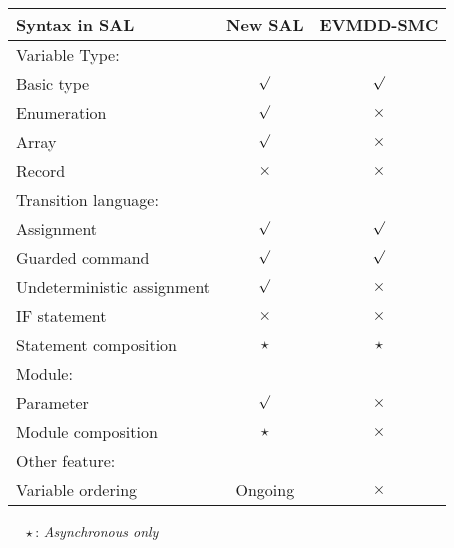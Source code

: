 
\begin{table}
\begin{center}
\small
\begin{tabular}{|l|c|c|}
\hline
 Syntax in SAL & New SAL & EVMDD-SMC \\
\hline
\multicolumn{3}{|l|}{Variable Type:} \\
\hline
Basic type	& $\surd$ 	& $\surd$  \\
Enumeration	& $\surd$	& $\times$ \\			  
Array		& $\surd$	& $\times$ \\			
Record		& $\times$	& $\times$ \\			
\hline
\multicolumn{3}{|l|}{Transition language:} \\
\hline
Assignment		& $\surd$ 	& $\surd$  \\
Guarded command	& $\surd$	& $\surd$ \\			  
Undeterministic assignment & $\surd$	& $\times$ \\			
IF statement	& $\times$	& $\times$ \\		
Statement composition & $\star$ & $\star$ \\
\hline
\multicolumn{3}{|l|}{Module:} \\
\hline
Parameter			& $\surd$ & $\times$ \\
Module composition 	& $\star$ & $\times$ \\
\hline
\multicolumn{3}{|l|}{Other feature:} \\
\hline
Variable ordering & Ongoing & $\times$ \\
\hline
\end{tabular}
\end{center}
\end{table}

{ \footnotesize
$~~~~~\star$: \emph{Asynchronous only}
}
